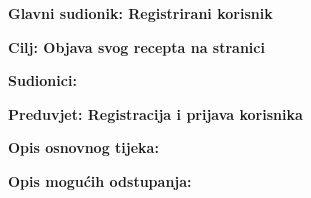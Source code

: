 					\noindent {}
					\begin{packed_item}
						
						\item \textbf{Glavni sudionik: Registrirani korisnik }
						\item  \textbf{Cilj: Objava svog recepta na stranici} 
						\item  \textbf{Sudionici:} 
						\item  \textbf{Preduvjet: Registracija i prijava korisnika} 
						\item  \textbf{Opis osnovnog tijeka:}
						
						\item[] \begin{packed_enum}
							
							\item 
							\item 
							\item 
							\item 
							\item 
						\end{packed_enum}
						
						\item  \textbf{Opis mogućih odstupanja:}
						
						\item[] \begin{packed_item}
							
							\item[2.a] 
							\item[] \begin{packed_enum}
								
								\item 
								\item
								
							\end{packed_enum}
							\item[2.b] 
							\item[3.a] 
							
						\end{packed_item}
					\end{packed_item}
					
